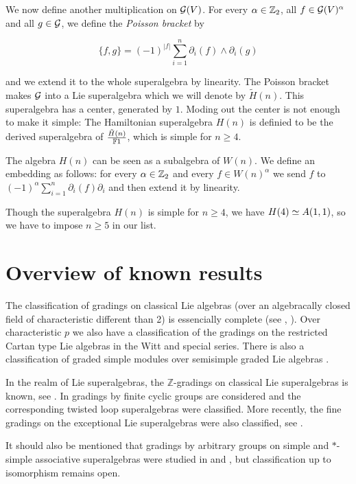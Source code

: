We now define another multiplication on $\mathcal G(V)$. For every $\alpha \in \mathbb{Z}_{2}$, all  $f\in \mathcal G(V)^{\alpha}$ and all $g\in \mathcal G$, we define the \emph{Poisson bracket} by

\[
	\{f,g\}=(-1)^{|f|} \sum_{i=1}^{n} \partial_i(f)\wedge \partial_i(g)
\]

and we extend it to the whole superalgebra by linearity. The Poisson bracket makes $\mathcal G$ into a Lie superalgebra which  we will denote by $\tilde{H} (n)$. This superalgebra has a center, generated by $1$. Moding out the center is not enough to make it simple: The Hamiltonian superalgebra $H(n)$ is definied to be the derived superalgebra of $\frac{\tilde{H}(n)}{\mathbb{F} 1}$, which is simple for $n\geq 4$.

The algebra $H(n)$ can be seen as a subalgebra of $W(n)$. We define an embedding as follows: for every $\alpha\in\mathbb{Z}_{2}$ and every $f\in W(n)^{\alpha}$ we send $f$ to $(-1)^{\alpha}\sum_{i=1}^n \partial_i(f)\partial_i$ and then extend it by linearity.

Though the superalgebra $H(n)$ is simple for $n\geq 4$, we have $H(4)\simeq A(1,1)$, so we have to impose $n\geq 5$ in our list.

\section{Overview of known results}

The classification of gradings on classical Lie algebras (over an algebracally closed field of characteristic different than 2) is essencially complete (see \cite{livromicha}, \cite{EK_d4}). Over characteristic $p$ we also have a classification of the gradings on the restricted Cartan type Lie algebras in the Witt and special series.  There is also a classification of graded simple modules over semisimple graded Lie algebras \cite{EK15}.

In the realm of Lie superalgebras, the  $\mathbb{Z}$-gradings on classical Lie superalgebras is known, see \cite{kacZ}. In \cite{serganova} gradings by finite cyclic groups are considered and the corresponding twisted loop superalgebras were classified. More recently, the fine gradings on the exceptional Lie superalgebras were also classified, see \cite{artigoelduque}.

It should also be mentioned that gradings by arbitrary groups on simple and $*$-simple associative superalgebras were studied in \cite{BS} and \cite{MR2535573}, but classification up to isomorphism remains open.
